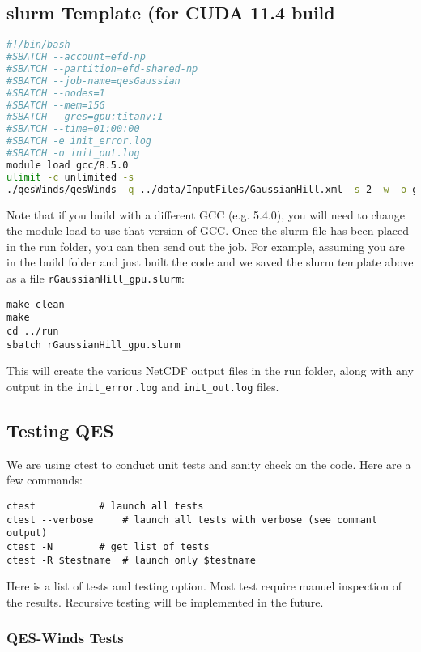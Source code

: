 \subsection{slurm Template (for CUDA 11.4 build}
\begin{lstlisting}[language=bash]
#!/bin/bash
#SBATCH --account=efd-np
#SBATCH --partition=efd-shared-np
#SBATCH --job-name=qesGaussian
#SBATCH --nodes=1
#SBATCH --mem=15G
#SBATCH --gres=gpu:titanv:1
#SBATCH --time=01:00:00
#SBATCH -e init_error.log
#SBATCH -o init_out.log
module load gcc/8.5.0
ulimit -c unlimited -s
./qesWinds/qesWinds -q ../data/InputFiles/GaussianHill.xml -s 2 -w -o gaussianHill
\end{lstlisting}

Note that if you build with a different GCC (e.g. 5.4.0), you will need to change the module load to use that version of GCC. Once the slurm file has been placed in the run folder, you can then send out the job.  For example, assuming you are in the build folder and just built the code and we saved the slurm template above as a file \verb|rGaussianHill_gpu.slurm|:

\begin{verbatim}
make clean
make
cd ../run
sbatch rGaussianHill_gpu.slurm
\end{verbatim}

This will create the various NetCDF output files in the run folder, along with any output in the \verb|init_error.log| and \verb|init_out.log| files.


\subsection{Testing QES}

We are using ctest to conduct unit tests and sanity check on the code. Here are a few commands:
\begin{verbatim}
ctest			# launch all tests
ctest --verbose		# launch all tests with verbose (see commant output)
ctest -N		# get list of tests
ctest -R $testname	# launch only $testname
\end{verbatim}
Here is a list of tests and testing option. Most test require manuel inspection of the results. Recursive testing will be implemented in the future.

\subsubsection{QES-Winds Tests}

